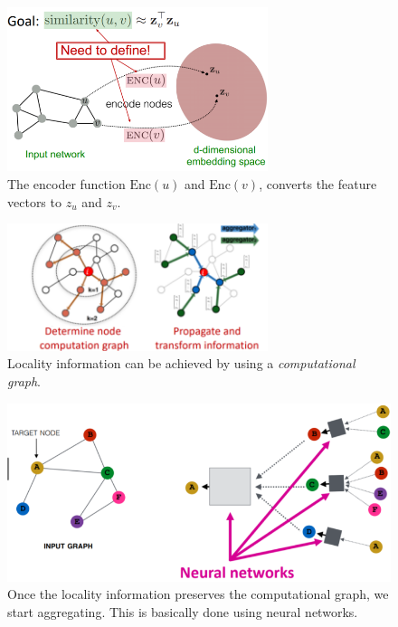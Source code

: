 \begin{figure}[H]
	\centering
	\includegraphics[width=0.68\textwidth]{
		images/16_DeepLearning_embeddingSpace.png
	}
	\caption{The encoder function $\text{Enc}(u)$ and $\text{Enc}(v)$, converts the
	feature vectors to $z_{u}$ and $z_{v}$.}
	\label{fig:fromInputNetworkToEmbeddingSpace}
\end{figure}

\begin{figure}[H]
	\centering
	\includegraphics[width=0.68\textwidth]{
		images/16_DeepLearning_computationalGraph.png
	}
	\caption{Locality information can be achieved by using a \textit{computational
	graph}.}
	\label{fig:computationalGraph}
\end{figure}

\begin{figure}[H]
	\centering
	\includegraphics[width=\textwidth]{
		images/16_DeepLearning_computationalGraphNeuralNetwork1.png
	}
	\caption{Once the locality information preserves the computational graph, we start
	aggregating. This is basically done using neural networks.}
	\label{fig:computationalGraphNeuralNetwork}
\end{figure}

